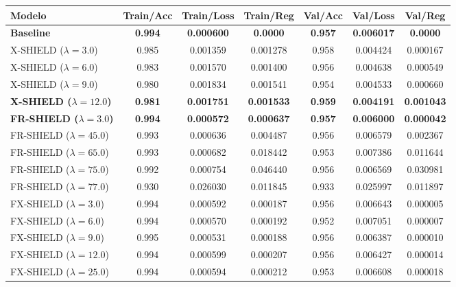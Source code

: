 \begin{table}[htbp]
\centering
{} %
\setlength{\arrayrulewidth}{0.8pt} %
\begin{tabular}{|l|cccccc|}
\hline
\rowcolor{gray!50} Modelo & Train/Acc & Train/Loss & Train/Reg & Val/Acc & Val/Loss & Val/Reg \\
\hline
\textbf{Baseline} & \textbf{0.994} & \textbf{0.000600} & \textbf{0.0000} & \textbf{0.957} & \textbf{0.006017} & \textbf{0.0000} \\
\hline
\rowcolor{gray!10} X-SHIELD ($\lambda = 3.0$) & 0.985 & 0.001359 & 0.001278 & 0.958 & 0.004424 & 0.000167 \\
\rowcolor{gray!10} X-SHIELD ($\lambda = 6.0$) & 0.983 & 0.001570 & 0.001400 & 0.956 & 0.004638 & 0.000549 \\
\rowcolor{gray!10} X-SHIELD ($\lambda = 9.0$) & 0.980 & 0.001834 & 0.001541 & 0.954 & 0.004533 & 0.000660 \\
\rowcolor{gray!10} \textbf{X-SHIELD ($\lambda = 12.0$)} & \textbf{0.981} & \textbf{0.001751} & \textbf{0.001533} & \textbf{0.959} & \textbf{0.004191} & \textbf{0.001043} \\
\hline
\textbf{FR-SHIELD ($\lambda = 3.0$)} & \textbf{0.994} & \textbf{0.000572} & \textbf{0.000637} & \textbf{0.957} & \textbf{0.006000} & \textbf{0.000042} \\
FR-SHIELD ($\lambda = 45.0$) & 0.993 & 0.000636 & 0.004487 & 0.956 & 0.006579 & 0.002367 \\
FR-SHIELD ($\lambda = 65.0$) & 0.993 & 0.000682 & 0.018442 & 0.953 & 0.007386 & 0.011644 \\
FR-SHIELD ($\lambda = 75.0$) & 0.992 & 0.000754 & 0.046440 & 0.956 & 0.006569 & 0.030981 \\
FR-SHIELD ($\lambda = 77.0$) & 0.930 & 0.026030 & 0.011845 & 0.933 & 0.025997 & 0.011897 \\
\hline
\rowcolor{gray!10} FX-SHIELD ($\lambda = 3.0$) & 0.994 & 0.000592 & 0.000187 & 0.956 & 0.006643 & 0.000005 \\
\rowcolor{gray!10} FX-SHIELD ($\lambda = 6.0$) & 0.994 & 0.000570 & 0.000192 & 0.952 & 0.007051 & 0.000007 \\
\rowcolor{gray!10} FX-SHIELD ($\lambda = 9.0$) & 0.995 & 0.000531 & 0.000188 & 0.956 & 0.006387 & 0.000010 \\
\rowcolor{gray!10} FX-SHIELD ($\lambda = 12.0$) & 0.994 & 0.000599 & 0.000207 & 0.956 & 0.006427 & 0.000014 \\
\rowcolor{gray!10} FX-SHIELD ($\lambda = 25.0$) & 0.994 & 0.000594 & 0.000212 & 0.953 & 0.006608 & 0.000018 \\

\end{tabular}
\end{table}
